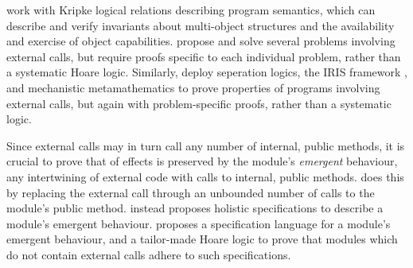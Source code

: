  \citet{dd} work with Kripke logical relations describing
program semantics, which can describe and verify invariants
about multi-object structures and the availability and exercise of
object capabilities.  \citeauthor{dd} propose and solve several
problems involving external calls, 
but require proofs specific to each individual problem,
rather than a systematic Hoare logic. Similarly,
\citet{vmsl-pldi2023} deploy seperation logics, the IRIS framework
\cite{iris-jfp2018}, and mechanistic metamathematics
to prove properties of programs involving external calls, but again
with problem-specific proofs, rather than a systematic logic.


Since external calls may in turn call any number of internal, public methods, 
it is crucial  to prove that \taming of effects is preserved by the module's 
\emph{emergent} behaviour, \ie any intertwining of external code with calls to internal, public methods.
\citet{CassezFQ24} 
does this by replacing the external call through an unbounded number of calls to the module's public method.
\citet{FASE} instead proposes holistic specifications to describe a module's emergent behaviour. 
\citet{OOPSLA22} proposes a specification language for a module's emergent behaviour, and a tailor-made Hoare logic to prove that modules which do not contain external calls adhere to such specifications.





